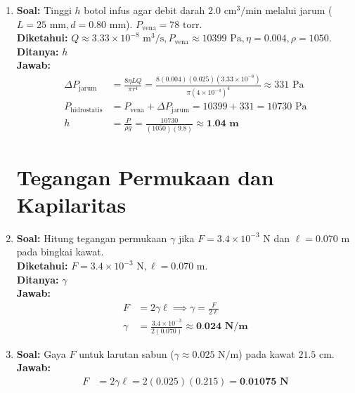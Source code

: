 \documentclass[twocolumn]{article}
\begin{document}
\begin{enumerate}
    \item \textbf{Soal:} Tinggi $h$ botol infus agar debit darah $2.0 \text{ cm}^3/\text{min}$ melalui jarum ($L = 25 \text{ mm}, d = 0.80 \text{ mm}$). $P_{\text{vena}} = 78 \text{ torr}$. \\
    \textbf{Diketahui:} $Q \approx 3.33 \times 10^{-8} \text{ m}^3/\text{s}, P_{\text{vena}} \approx 10399 \text{ Pa}, \eta = 0.004, \rho = 1050$. \\
    \textbf{Ditanya:} $h$ \\
    \textbf{Jawab:}
    \begin{align*}
        \Delta P_{\text{jarum}} &= \frac{8 \eta L Q}{\pi r^4} = \frac{8(0.004)(0.025)(3.33 \times 10^{-8})}{\pi (4 \times 10^{-4})^4} \approx 331 \text{ Pa} \\
        P_{\text{hidrostatis}} &= P_{\text{vena}} + \Delta P_{\text{jarum}} = 10399 + 331 = 10730 \text{ Pa} \\
        h &= \frac{P}{\rho g} = \frac{10730}{(1050)(9.8)} \approx \textbf{1.04 m}
    \end{align*}

\section*{Tegangan Permukaan dan Kapilaritas}

    \item \textbf{Soal:} Hitung tegangan permukaan $\gamma$ jika $F = 3.4 \times 10^{-3} \text{ N}$ dan $\ell = 0.070 \text{ m}$ pada bingkai kawat. \\
    \textbf{Diketahui:} $F = 3.4 \times 10^{-3} \text{ N}, \ell = 0.070 \text{ m}$. \\
    \textbf{Ditanya:} $\gamma$ \\
    \textbf{Jawab:}
    \begin{align*}
        F &= 2 \gamma \ell \implies \gamma = \frac{F}{2\ell} \\
        \gamma &= \frac{3.4 \times 10^{-3}}{2(0.070)} \approx \textbf{0.024 N/m}
    \end{align*}

    \item \textbf{Soal:} Gaya $F$ untuk larutan sabun ($\gamma \approx 0.025 \text{ N/m}$) pada kawat $21.5 \text{ cm}$. \\
    \textbf{Jawab:}
    \begin{align*}
        F &= 2 \gamma \ell = 2(0.025)(0.215) = \textbf{0.01075 N}
    \end{align*}


\end{enumerate}
\end{document}
